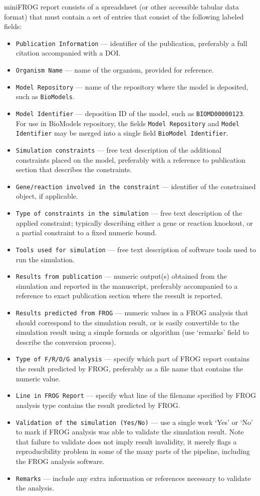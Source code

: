 miniFROG report consists of a spreadsheet (or other accessible tabular data format) that must contain a set of entries that consist of the following labeled fields:
\begin{itemize}
\item \texttt{Publication Information} --- identifier of the publication, preferably a full citation accompanied with a DOI.
\item \texttt{Organism Name} --- name of the organism, provided for reference.
\item \texttt{Model Repository} --- name of the repository where the model is deposited, such as \texttt{BioModels}.
\item \texttt{Model Identifier} --- deposition ID of the model, such as \texttt{BIOMD00000123}. For use in BioModels repository, the fields \texttt{Model Repository} and \texttt{Model Identifier} may be merged into a single field \texttt{BioModel Identifier}.
\item \texttt{Simulation constraints} --- free text description of the additional constraints placed on the model, preferably with a reference to publication section that describes the constraints.
\item \texttt{Gene/reaction involved in the constraint} --- identifier of the constrained object, if applicable.
\item \texttt{Type of constraints in the simulation} --- free text description of the applied constraint; typically describing either a gene or reaction knockout, or a partial constraint to a fixed numeric bound.
\item \texttt{Tools used for simulation} --- free text description of software tools used to run the simulation.
\item \texttt{Results from publication} --- numeric output(s) obtained from the simulation and reported in the manuscript, preferably accompanied to a reference to exact publication section where the reesult is reported.
\item \texttt{Results predicted from FROG} --- numeric values in a FROG analysis that should correspond to the simulation result, or is easily convertible to the simulation result using a simple formula or algorithm (use `remarks' field to describe the conversion process).
\item \texttt{Type of F/R/O/G analysis} --- specify which part of FROG report contains the result predicted by FROG, preferably as a file name that contains the numeric value.
\item \texttt{Line in FROG Report} --- specify what line of the filename specified by FROG analysis type contains the result predicted by FROG.
\item \texttt{Validation of the simulation (Yes/No)} --- use a single work `Yes' or `No' to mark if FROG analysis was able to validate the simulation result. Note that failure to validate does not imply result invalidity, it merely flags a reproducibility problem in some of the many parts of the pipeline, including the FROG analysis software.
\item \texttt{Remarks} --- include any extra information or references necessary to validate the analysis.
\end{itemize}

